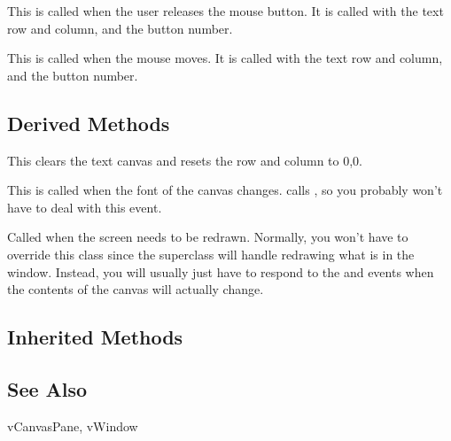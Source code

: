 This is called when the user releases the mouse button.
It is called with the text row and column, and the button number.


This is called when the mouse moves.
It is called with the text row and column, and the button number.


\subsection* {Derived Methods}	


This clears the text canvas and resets the row and column
to 0,0.


This is called when the font of the canvas changes.
 calls , so you probably
won't have to deal with this event.


Called when the screen needs to be redrawn. Normally, you won't
have to override this class since the 
superclass will handle redrawing what is in the window. Instead,
you will usually just have to respond to the 
and  events when the contents of the canvas will
actually change.

\subsection* {Inherited Methods}	%








\subsection* {See Also}

vCanvasPane, vWindow
